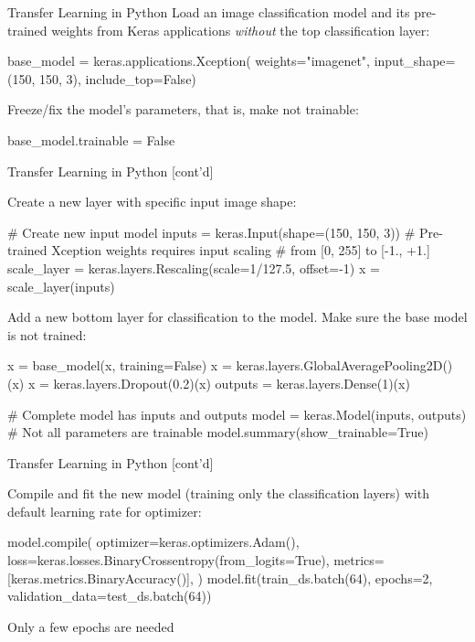 \documentclass[ignorenonframetext,xcolor=x11names]{beamer}
\begin{document}
\begin{frame}[fragile]{Transfer Learning in Python}
Load an image classification model and its  pre-trained  weights from Keras applications \emph{without} the top classification layer:
\begin{pythoncode}
base_model = keras.applications.Xception(
    weights="imagenet",
    input_shape=(150, 150, 3),
    include_top=False)
\end{pythoncode}

Freeze/fix the model's parameters, that is, make not trainable:
\begin{pythoncode}
base_model.trainable = False
\end{pythoncode}
\end{frame}

\begin{frame}[fragile]{Transfer Learning in Python \small [cont'd]}

Create a new layer with specific input image shape:
\begin{pythoncode}
# Create new input model
inputs = keras.Input(shape=(150, 150, 3))
# Pre-trained Xception weights requires input scaling
# from [0, 255] to [-1., +1.]
scale_layer = keras.layers.Rescaling(scale=1/127.5, offset=-1)
x = scale_layer(inputs)
\end{pythoncode}

Add a new bottom layer for classification to the model. Make sure the base model is not trained:
\begin{pythoncode}
x = base_model(x, training=False)
x = keras.layers.GlobalAveragePooling2D()(x)
x = keras.layers.Dropout(0.2)(x)
outputs = keras.layers.Dense(1)(x)

# Complete model has inputs and outputs
model = keras.Model(inputs, outputs)
# Not all parameters are trainable
model.summary(show_trainable=True)
\end{pythoncode}
\end{frame}

\begin{frame}[fragile]{Transfer Learning in Python \small [cont'd]}

Compile and fit the new model (training only the classification layers) with default learning rate for optimizer:
\begin{pythoncode}
model.compile(
    optimizer=keras.optimizers.Adam(),
    loss=keras.losses.BinaryCrossentropy(from_logits=True),
    metrics=[keras.metrics.BinaryAccuracy()],
)
model.fit(train_ds.batch(64), epochs=2, 
          validation_data=test_ds.batch(64))
\end{pythoncode}
\begin{block}{}
Only a few epochs are needed
\end{block}

\end{frame}
\end{document}
